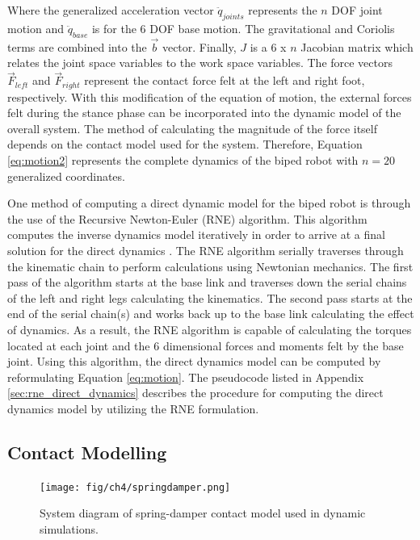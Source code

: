 Where the generalized acceleration vector $\ddot{q}_{joints}$ represents the $n$ DOF joint motion and $\ddot{q}_{base}$ is for the 6 DOF base motion. The gravitational and Coriolis terms are combined into the $\vec{b}$ vector. Finally, $J$ is a 6 x $n$ Jacobian matrix which relates the joint space variables to the work space variables. The force vectors $\vec{F}_{left}$ and $\vec{F}_{right}$ represent the contact force felt at the left and right foot, respectively. With this modification of the equation of motion, the external forces felt during the stance phase can be incorporated into the dynamic model of the overall system. The method of calculating the magnitude of the force itself depends on the contact model used for the system. Therefore, Equation \ref{eq:motion2} represents the complete dynamics of the biped robot with $n = 20$ generalized coordinates.

One method of computing a direct dynamic model for the biped robot is through the use of the Recursive Newton-Euler (RNE) algorithm. This algorithm computes the inverse dynamics model iteratively in order to arrive at a final solution for the direct dynamics \cite{Perrin:1997wn}. The RNE algorithm serially traverses through the kinematic chain to perform calculations using Newtonian mechanics. The first pass of the algorithm starts at the base link and traverses down the serial chains of the left and right legs calculating the kinematics. The second pass starts at the end of the serial chain(s) and works back up to the base link calculating the effect of dynamics. As a result, the RNE algorithm is capable of calculating the torques located at each joint and the 6 dimensional forces and moments felt by the base joint. Using this algorithm, the direct dynamics model can be computed by reformulating Equation \ref{eq:motion}. The pseudocode listed in Appendix \ref{sec:rne_direct_dynamics} describes the procedure for computing the direct dynamics model by utilizing the RNE formulation.


\subsection{Contact Modelling} %
\label{sec:contact_modelling}

\begin{figure}[!ht]
	\begin{center}
    \texttt{[image: fig/ch4/springdamper.png]}
	\end{center}
  \caption{System diagram of spring-damper contact model used in dynamic simulations.}
\end{figure}

